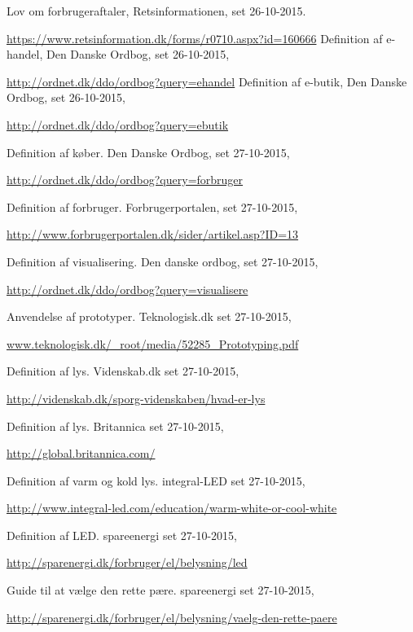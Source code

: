   Lov om forbrugeraftaler,
  Retsinformationen,
  set 26-10-2015.
  
  \url{https://www.retsinformation.dk/forms/r0710.aspx?id=160666}
  Definition af e-handel,
  Den Danske Ordbog,
  set 26-10-2015,
  
  \url{http://ordnet.dk/ddo/ordbog?query=ehandel}
  Definition af e-butik,
  Den Danske Ordbog,
  set 26-10-2015,
  
  \url{http://ordnet.dk/ddo/ordbog?query=ebutik}

  Definition af køber.
  Den Danske Ordbog,
  set 27-10-2015,
  
  \url{http://ordnet.dk/ddo/ordbog?query=forbruger}

  Definition af forbruger.
  Forbrugerportalen,
  set 27-10-2015,
  
  \url{http://www.forbrugerportalen.dk/sider/artikel.asp?ID=13}

  Definition af visualisering.
  Den danske ordbog,
  set 27-10-2015,
  
  \url{http://ordnet.dk/ddo/ordbog?query=visualisere}

  Anvendelse af prototyper.
  Teknologisk.dk
  set 27-10-2015,
  
  \url{www.teknologisk.dk/_root/media/52285_Prototyping.pdf}

  Definition af lys.
  Videnskab.dk
  set 27-10-2015,
  
  \url{http://videnskab.dk/sporg-videnskaben/hvad-er-lys}

  Definition af lys.
  Britannica
  set 27-10-2015,
  
  \url{http://global.britannica.com/}

  Definition af varm og kold lys.
  integral-LED
  set 27-10-2015,
  
  \url{http://www.integral-led.com/education/warm-white-or-cool-white}

  Definition af LED.
  spareenergi
  set 27-10-2015,
  
  \url{http://sparenergi.dk/forbruger/el/belysning/led}

  Guide til at vælge den rette pære.
  spareenergi
  set 27-10-2015,
  
  \url{http://sparenergi.dk/forbruger/el/belysning/vaelg-den-rette-paere}

